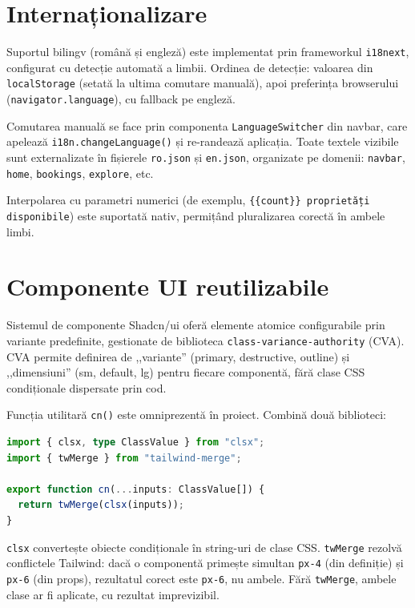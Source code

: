 \documentclass[12pt,a4paper,oneside]{report}
\begin{document}
\section{Internaționalizare}

Suportul bilingv (română și engleză) este implementat prin frameworkul \texttt{i18next}, configurat cu detecție automată a limbii. Ordinea de detecție: valoarea din \texttt{localStorage} (setată la ultima comutare manuală), apoi preferința browserului (\texttt{navigator.language}), cu fallback pe engleză.

Comutarea manuală se face prin componenta \texttt{LanguageSwitcher} din navbar, care apelează \texttt{i18n.changeLanguage()} și re-randează aplicația. Toate textele vizibile sunt externalizate în fișierele \texttt{ro.json} și \texttt{en.json}, organizate pe domenii: \texttt{navbar}, \texttt{home}, \texttt{bookings}, \texttt{explore}, etc.

Interpolarea cu parametri numerici (de exemplu, \texttt{\{\{count\}\} proprietăți disponibile}) este suportată nativ, permițând pluralizarea corectă în ambele limbi.


\section{Componente UI reutilizabile}

Sistemul de componente Shadcn/ui oferă elemente atomice configurabile prin variante predefinite, gestionate de biblioteca \texttt{class-variance-authority} (CVA). CVA permite definirea de ,,variante'' (primary, destructive, outline) și ,,dimensiuni'' (sm, default, lg) pentru fiecare componentă, fără clase CSS condiționale dispersate prin cod.

Funcția utilitară \texttt{cn()} este omniprezentă în proiect. Combină două biblioteci:

\begin{lstlisting}[language=TypeScript, caption={Funcția utilitară cn()}]
import { clsx, type ClassValue } from "clsx";
import { twMerge } from "tailwind-merge";

export function cn(...inputs: ClassValue[]) {
  return twMerge(clsx(inputs));
}
\end{lstlisting}

\texttt{clsx} convertește obiecte condiționale în string-uri de clase CSS. \texttt{twMerge} rezolvă conflictele Tailwind: dacă o componentă primește simultan \texttt{px-4} (din definiție) și \texttt{px-6} (din props), rezultatul corect este \texttt{px-6}, nu ambele. Fără \texttt{twMerge}, ambele clase ar fi aplicate, cu rezultat imprevizibil.
\end{document}
